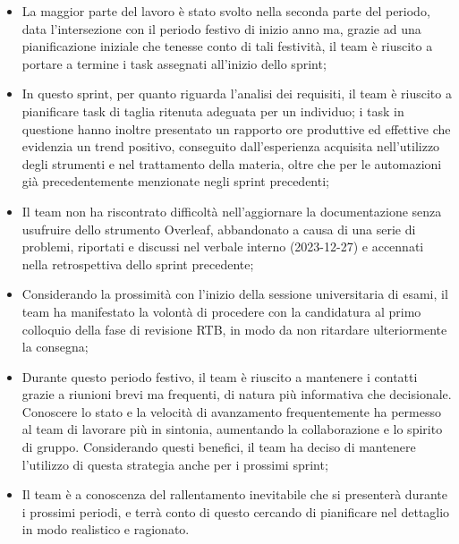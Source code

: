 \documentclass[10pt, a4paper]{article}
\begin{document}
\begin{itemize}
    \item La maggior parte del lavoro è stato svolto nella seconda parte del periodo, data l'intersezione con il periodo festivo di inizio anno ma, grazie ad una pianificazione iniziale 
    che tenesse conto di tali festività, il team è riuscito a portare a termine i task assegnati all'inizio dello sprint;
    \item In questo sprint, per quanto riguarda l'analisi dei requisiti, il team è riuscito a pianificare task di taglia ritenuta adeguata per un individuo; i task in questione hanno inoltre 
    presentato un rapporto ore produttive ed effettive che evidenzia un trend positivo, conseguito dall'esperienza acquisita nell'utilizzo degli strumenti e nel trattamento della materia, oltre
    che per le automazioni già precedentemente menzionate negli sprint precedenti; 
    \item Il team non ha riscontrato difficoltà nell'aggiornare la documentazione senza usufruire dello strumento Overleaf, abbandonato a causa di una serie di problemi, riportati e 
    discussi nel verbale interno (2023-12-27) e accennati nella retrospettiva dello sprint precedente;
    \item Considerando la prossimità con l'inizio della sessione universitaria di esami, il team ha manifestato la volontà di procedere con la candidatura al primo colloquio della fase di revisione RTB, in modo da non ritardare ulteriormente la consegna;
    \item Durante questo periodo festivo, il team è riuscito a mantenere i contatti grazie a riunioni brevi ma frequenti, di natura più informativa che decisionale. Conoscere lo stato e la velocità di avanzamento frequentemente ha permesso al team di 
    lavorare più in sintonia, aumentando la collaborazione e lo spirito di gruppo. Considerando questi benefici, il team ha deciso di mantenere l'utilizzo di questa strategia anche per i prossimi sprint;
    \item Il team è a conoscenza del rallentamento inevitabile che si presenterà durante i prossimi periodi, e terrà conto di questo cercando di pianificare nel dettaglio in modo realistico e ragionato. 
\end{itemize}
\end{document}

